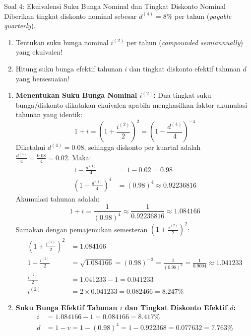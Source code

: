 \documentclass[11pt,a4paper]{article}
\begin{document}
\begin{problembox}{Soal 4: Ekuivalensi Suku Bunga Nominal dan Tingkat Diskonto Nominal}
Diberikan tingkat diskonto nominal sebesar $d^{(4)} = 8\%$ per tahun (\textit{payable quarterly}).
\begin{enumerate}[label=(\alph*)]
    \item Tentukan suku bunga nominal $i^{(2)}$ per tahun (\textit{compounded semiannually}) yang ekuivalen!
    \item Hitung suku bunga efektif tahunan $i$ dan tingkat diskonto efektif tahunan $d$ yang bersesuaian!
\end{enumerate}
\end{problembox}

\begin{solutionbox}[Soal 4]
\begin{enumerate}[label=(\alph*)]
    \item \textbf{Menentukan Suku Bunga Nominal $i^{(2)}$:}
    Dua tingkat suku bunga/diskonto dikatakan ekuivalen apabila menghasilkan faktor akumulasi tahunan yang identik:
    \begin{equation*}
        1 + i = \left( 1 + \frac{i^{(2)}}{2} \right)^2 = \left( 1 - \frac{d^{(4)}}{4} \right)^{-4}
    \end{equation*}
    Diketahui $d^{(4)} = 0.08$, sehingga diskonto per kuartal adalah $\frac{d^{(4)}}{4} = \frac{0.08}{4} = 0.02$.
    Maka:
    \begin{align*}
        1 - \frac{d^{(4)}}{4} &= 1 - 0.02 = 0.98 \\
        \left( 1 - \frac{d^{(4)}}{4} \right)^4 &= (0.98)^4 \approx 0.92236816
    \end{align*}
    Akumulasi tahunan adalah:
    \begin{equation*}
        1 + i = \frac{1}{(0.98)^4} \approx \frac{1}{0.92236816} \approx 1.084166
    \end{equation*}
    Samakan dengan pemajemukan semesteran $\left(1 + \frac{i^{(2)}}{2}\right)^2$:
    \begin{align*}
        \left( 1 + \frac{i^{(2)}}{2} \right)^2 &= 1.084166 \\[0.4em]
        1 + \frac{i^{(2)}}{2} &= \sqrt{1.084166} = (0.98)^{-2} = \frac{1}{(0.98)^2} = \frac{1}{0.9604} \approx 1.041233 \\[0.4em]
        \frac{i^{(2)}}{2} &= 1.041233 - 1 = 0.041233 \\[0.4em]
        i^{(2)} &= 2 \times 0.041233 = 0.082466 = \mathbf{8.247\%}
    \end{align*}

    \item \textbf{Suku Bunga Efektif Tahunan $i$ dan Tingkat Diskonto Efektif $d$:}
    \begin{align*}
        i &= 1.084166 - 1 = 0.084166 = \mathbf{8.417\%} \\[0.3em]
        d &= 1 - v = 1 - (0.98)^4 = 1 - 0.922368 = 0.077632 = \mathbf{7.763\%}
    \end{align*}
\end{enumerate}
\end{solutionbox}
\end{document}
